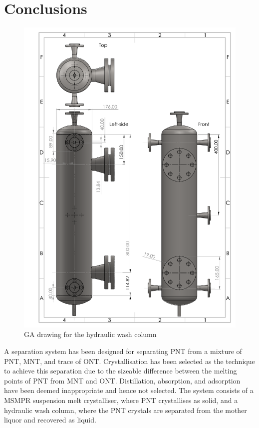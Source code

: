 \section{Conclusions}\label{separation conclusions}

\begin{figure}
    \centering
    \includegraphics[scale=0.3]{chapters/3-separation/figures/Hydraulic_Wash_Column_GA.PDF}
    \caption{GA drawing for the hydraulic wash column}
    \label{fig:wash column GA}
\end{figure} 

A separation system has been designed for separating PNT from a mixture of PNT, MNT, and trace of ONT. Crystallisation has been selected as the technique to achieve this separation due to the sizeable difference between the melting points of PNT from MNT and ONT. Distillation, absorption, and adsorption have been deemed inappropriate and hence not selected. The system consists of a MSMPR suspension melt crystalliser, where PNT crystallises as solid, and a hydraulic wash column, where the PNT crystals are separated from the mother liquor and recovered as liquid. 

